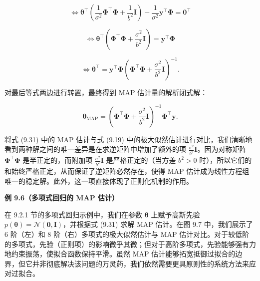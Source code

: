 \begin{equation}
\iff \boldsymbol{\theta}^\top \left( \frac{1}{\sigma^2}\boldsymbol{\Phi}^\top \boldsymbol{\Phi} + \frac{1}{b^2}\boldsymbol{I} \right) - \frac{1}{\sigma^2}\boldsymbol{y}^\top \boldsymbol{\Phi} = \boldsymbol{0}^\top
\tag{9.30b}
\end{equation}

\begin{equation}
\iff \boldsymbol{\theta}^\top \left( \boldsymbol{\Phi}^\top \boldsymbol{\Phi} + \frac{\sigma^2}{b^2}\boldsymbol{I} \right) = \boldsymbol{y}^\top \boldsymbol{\Phi}
\tag{9.30c}
\end{equation}

\begin{equation}
\iff \boldsymbol{\theta}^\top = \boldsymbol{y}^\top \boldsymbol{\Phi}\left( \boldsymbol{\Phi}^\top \boldsymbol{\Phi} + \frac{\sigma^2}{b^2}\boldsymbol{I} \right)^{-1} .
\tag{9.30d}
\end{equation}

对最后等式两边进行转置，最终得到 MAP 估计量的解析闭式解：

\begin{equation}
\boldsymbol{\theta}_{\text{MAP}} = \left( \boldsymbol{\Phi}^\top \boldsymbol{\Phi} + \frac{\sigma^2}{b^2}\boldsymbol{I} \right)^{-1}\boldsymbol{\Phi}^\top \boldsymbol{y} .
\tag{9.31}
\end{equation}

将式 (9.31) 中的 MAP 估计与式 (9.19) 中的极大似然估计进行对比，我们清晰地看到两种解之间的唯一差异是在求逆矩阵中增加了额外的项 $ \frac{\sigma^2}{b^2}\boldsymbol{I} $。因为对称矩阵 $ \boldsymbol{\Phi}^\top \boldsymbol{\Phi} $ 是半正定的，而附加项 $ \frac{\sigma^2}{b^2}\boldsymbol{I} $ 是严格正定的（当方差 $ b^2 > 0 $ 时），所以它们的和始终严格正定，从而保证了逆矩阵必然存在，使得 MAP 估计成为线性方程组唯一的稳定解。此外，这一项直接体现了正则化机制的作用。

\begin{notebox}
\textbf{例 9.6（多项式回归的 MAP 估计）}
\end{notebox}

\begin{notebox}
在 9.2.1 节的多项式回归示例中，我们在参数 $ \boldsymbol{\theta} $ 上赋予高斯先验 $ p(\boldsymbol{\theta}) = \mathcal{N}(\boldsymbol{0}, \boldsymbol{I}) $，并根据式 (9.31) 求解 MAP 估计。在图 9.7 中，我们展示了 6 阶（左）和 8 阶（右）多项式的极大似然估计与 MAP 估计对比。对于较低阶的多项式，先验（正则项）的影响微乎其微；但对于高阶多项式，先验能够强有力地约束振荡，使拟合函数保持平滑。虽然 MAP 估计能够拓宽抵御过拟合的边界，但它并非彻底解决该问题的万灵药，我们依然需要更具原则性的系统方法来应对过拟合。
\end{notebox}


